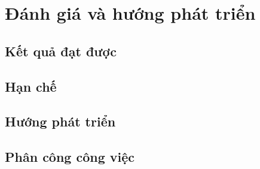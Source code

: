 \chapter{Đánh giá và hướng phát triển}
\section{Kết quả đạt được}
\section{Hạn chế}
\section{Hướng phát triển}
\section{Phân công công việc}
